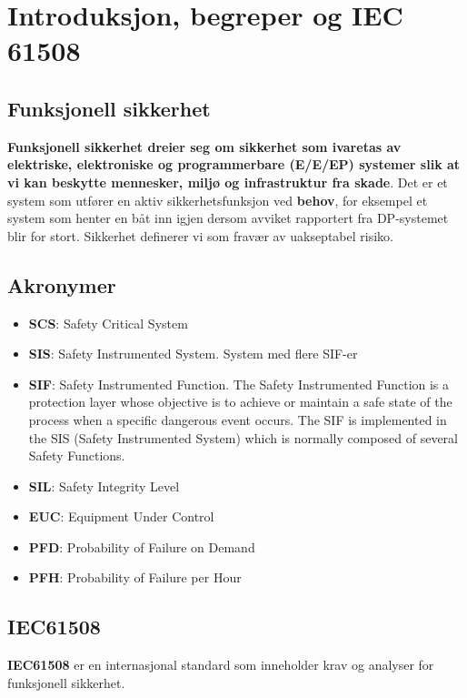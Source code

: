 \section{Introduksjon, begreper og IEC 61508}
\label{sec:intro}

\subsection{Funksjonell sikkerhet}

\textbf{Funksjonell sikkerhet dreier seg om sikkerhet som ivaretas av elektriske, elektroniske og programmerbare (E/E/EP) systemer slik at vi kan beskytte mennesker, miljø og infrastruktur fra skade}. Det er et system som utfører en aktiv sikkerhetsfunksjon ved \textbf{behov}, for eksempel et system som henter en båt inn igjen dersom avviket rapportert fra DP-systemet blir for stort. Sikkerhet definerer vi som fravær av uakseptabel risiko.


\subsection{Akronymer}

\begin{itemize}
    \item \textbf{SCS}: Safety Critical System
    \item \textbf{SIS}: Safety Instrumented System. System med flere SIF-er
    \item \textbf{SIF}: Safety Instrumented Function. The Safety Instrumented Function is a protection layer whose objective is to achieve or maintain a safe state of the process when a specific dangerous event occurs. The SIF is implemented in the SIS (Safety Instrumented System) which is normally composed of several Safety Functions.
    \item \textbf{SIL}: Safety Integrity Level
    \item \textbf{EUC}: Equipment Under Control
    \item \textbf{PFD}: Probability of Failure on Demand
    \item \textbf{PFH}: Probability of Failure per Hour
\end{itemize}

\subsection{IEC61508}

\textbf{IEC61508} er en internasjonal standard som inneholder krav og analyser for funksjonell sikkerhet.



